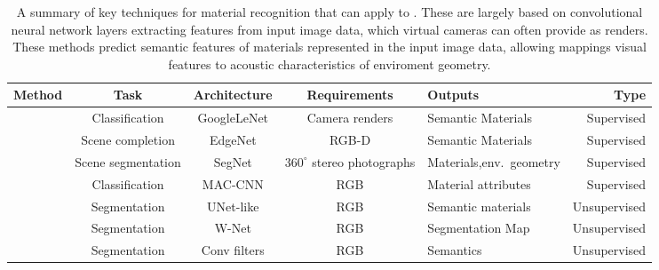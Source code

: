\begin{landscape}
    \begin{table}[tbp]
        \centering
        \caption{A summary of key techniques for material recognition that can apply to . These are largely based on convolutional neural network layers extracting features from input image data, which virtual cameras can often provide as renders. These methods predict semantic features of materials represented in the input image data, allowing mappings visual features to acoustic characteristics of enviroment geometry.}
            
            \begin{tabularx}{\linewidth}{lcccXr}
                \toprule
                Method                                            & Task                     & Architecture   & Requirements             & Outputs             & Type       \\ \midrule
                \cite{schissler2017acoustic}                      & Classification           & GoogleLeNet    & Camera renders           & Semantic Materials  & Supervised \\
                \cite{dourado2019edgenet}                         & Scene completion         & EdgeNet        & RGB-D                    & Semantic Materials  & Supervised \\
                \cite{kim2019immersive}                           & Scene segmentation       & SegNet         & $360^\circ$ stereo \newline{} photographs & Materials,\newline env.\ geometry  & Supervised \\
                
                \cite{schwartz2019recognizing}                    & Classification           & MAC-CNN       & RGB                       & Material attributes  & Supervised \\
                \cite{gaur2019superpixel}                         & Segmentation             & UNet-like     & RGB                       & Semantic materials   & Unsupervised \\
                \cite{xia2017w}                                   & Segmentation             & W-Net         & RGB                       & Segmentation Map     & Unsupervised \\
                \cite{kiechle2018model}                           & Segmentation             & Conv filters  & RGB                       & Semantics            & Unsupervised \\ \bottomrule 
            \end{tabularx}\label{tab:material-recongition-techniques}
        \end{table}

\end{landscape}
